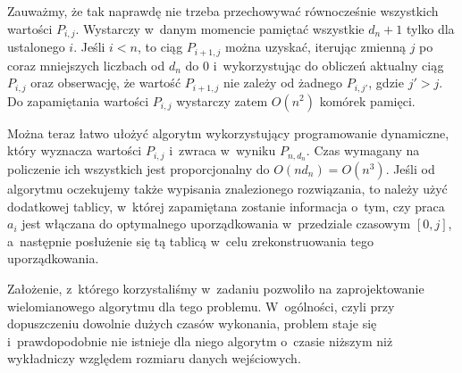 Zauważmy, że tak naprawdę nie trzeba przechowywać równocześnie wszystkich wartości $P_{i,j}$.
Wystarczy w~danym momencie pamiętać wszystkie $d_n+1$ tylko dla ustalonego $i$.
Jeśli $i<n$, to ciąg $P_{i+1,j}$ można uzyskać, iterując zmienną $j$ po coraz mniejszych liczbach od $d_n$ do 0 i~wykorzystując do obliczeń aktualny ciąg $P_{i,j}$ oraz obserwację, że wartość $P_{i+1,j}$ nie zależy od żadnego $P_{i,j'}$, gdzie $j'>j$.
Do zapamiętania wartości $P_{i,j}$ wystarczy zatem $O(n^2)$ komórek pamięci.

Można teraz łatwo ułożyć algorytm wykorzystujący programowanie dynamiczne, który wyznacza wartości $P_{i,j}$ i~zwraca w~wyniku $P_{n,d_n}$\!.
Czas wymagany na policzenie ich wszystkich jest proporcjonalny do $O(nd_n)=O(n^3)$.
Jeśli od algorytmu oczekujemy także wypisania znalezionego rozwiązania, to należy użyć dodatkowej tablicy, w~której zapamiętana zostanie informacja o~tym, czy praca $a_i$ jest włączana do optymalnego uporządkowania w~przedziale czasowym $[0,j]$, a~następnie posłużenie się tą tablicą w~celu zrekonstruowania tego uporządkowania.

Założenie, z~którego korzystaliśmy w~zadaniu pozwoliło na zaprojektowanie wielomianowego algorytmu dla tego problemu.
W~ogólności, czyli przy dopuszczeniu dowolnie dużych czasów wykonania, problem staje się  i~prawdopodobnie nie istnieje dla niego algorytm o~czasie niższym niż wykładniczy względem rozmiaru danych wejściowych.
